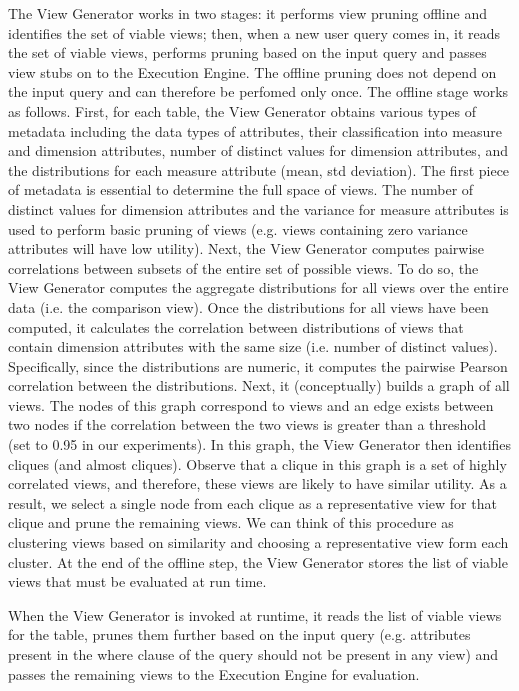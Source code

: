 The View Generator works in two stages: it performs view pruning offline and
identifies the set of viable views; then, when a new user query comes in, it
reads the set of viable views, performs pruning based on the input query and
passes view stubs on to the Execution Engine. 
The offline pruning does not depend on the input query and can therefore be
perfomed only once.
The offline stage works as follows. 
First, for each table, the View Generator obtains various types of
metadata including the data types of attributes, their classification into
measure and dimension attributes, number of distinct values for dimension
attributes, and the distributions for each measure attribute (mean, std
deviation).
The first piece of metadata is essential to determine the full space of
views. 
The number of distinct values for dimension attributes and the variance for
measure attributes is used to perform basic pruning of views (e.g. views
containing zero variance attributes will have low utility).
Next, the View Generator computes pairwise correlations between subsets of the
entire set of possible views.
To do so, the View Generator computes the aggregate distributions for all views
over the entire data (i.e. the comparison view). 
Once the distributions for all views have been computed, it calculates the
correlation between distributions of views that contain dimension attributes
with the same size (i.e. number of distinct values).
Specifically, since the distributions are numeric, it computes the pairwise
Pearson correlation between the distributions.
Next, it (conceptually) builds a graph of all views. 
The nodes of this graph correspond to views and an edge exists between two nodes
if the correlation between the two views is greater than a threshold (set to 0.95 in
our experiments). 
In this graph, the View Generator then identifies cliques (and almost cliques).
Observe that a clique in this graph is a set of highly correlated views,
and therefore, these views are likely to have similar utility. 
As a result, we select a
single node from each clique as a representative view for that clique and
prune the remaining views. 
We can think of this procedure as clustering views based on similarity and
choosing a representative view form each cluster.
At the end of the offline step, the View Generator stores the list of
viable views that must be evaluated at run time.

When the View Generator is invoked at runtime, it reads the list of viable
views for the table, prunes them further based on the input query (e.g.
attributes present in the where clause of the query should not be present in
any view) and passes the remaining views to the Execution Engine for
evaluation.

